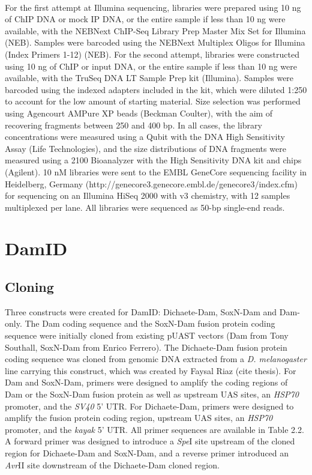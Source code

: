 \paragraph{}
For the first attempt at Illumina sequencing, libraries were prepared using 10 ng of ChIP DNA or mock IP DNA, or the entire sample if less than 10 ng were available, with the NEBNext ChIP-Seq Library Prep Master Mix Set for Illumina (NEB). Samples were barcoded using the NEBNext Multiplex Oligos for Illumina (Index Primers 1-12) (NEB). For the second attempt, libraries were constructed using 10 ng of ChIP or input DNA, or the entire sample if less than 10 ng were available, with the TruSeq DNA LT Sample Prep kit (Illumina). Samples were barcoded using the indexed adapters included in the kit, which were diluted 1:250 to account for the low amount of starting material. Size selection was performed using Agencourt AMPure XP beads (Beckman Coulter), with the aim of recovering fragments between 250 and 400 bp. In all cases, the library concentrations were measured using a Qubit with the DNA High Sensitivity Assay (Life Technologies), and the size distributions of DNA fragments were measured using a 2100 Bioanalyzer with the High Sensitivity DNA kit and chips (Agilent). 10 nM libraries were sent to the EMBL GeneCore sequencing facility in Heidelberg, Germany (http://genecore3.genecore.embl.de/genecore3/index.cfm) for sequencing on an Illumina HiSeq 2000 with v3 chemistry, with 12 samples multiplexed per lane. All libraries were sequenced as 50-bp single-end reads.

\section{DamID}
\subsection{Cloning}
Three constructs were created for DamID: Dichaete-Dam, SoxN-Dam and Dam-only. The Dam coding sequence and the SoxN-Dam fusion protein coding sequence were initially cloned from existing pUAST vectors (Dam from Tony Southall, SoxN-Dam from Enrico Ferrero). The Dichaete-Dam fusion protein coding sequence was cloned from genomic DNA extracted from a \emph{D. melanogaster} line carrying this construct, which was created by Faysal Riaz (cite thesis). For Dam and SoxN-Dam, primers were designed to amplify the coding regions of Dam or the SoxN-Dam fusion protein as well as upstream UAS sites, an \emph{HSP70} promoter, and the \emph{SV40} 5’ UTR. For Dichaete-Dam, primers were designed to amplify the fusion protein coding region, upstream UAS sites, an \emph{HSP70} promoter, and the \emph{kayak} 5’ UTR. All primer sequences are available in Table 2.2. A forward primer was designed to introduce a \emph{Spe}I site upstream of the cloned region for Dichaete-Dam and SoxN-Dam, and a reverse primer introduced an \emph{Avr}II site downstream of the Dichaete-Dam cloned region.
